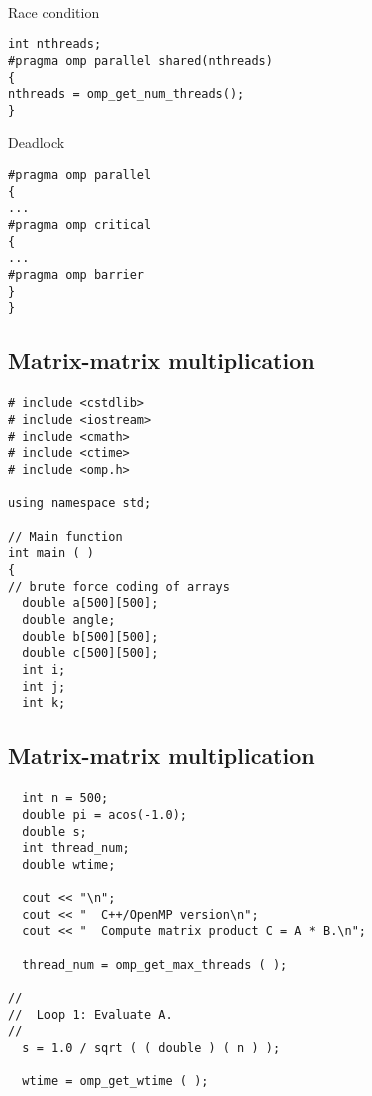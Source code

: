 \documentclass[%
oneside,                 %
final,                   %
10pt]{article}
\begin{document}
\paragraph{}
Race condition
\begin{verbatim}
int nthreads;
#pragma omp parallel shared(nthreads)
{
nthreads = omp_get_num_threads();
}
\end{verbatim}
Deadlock
\begin{verbatim}
#pragma omp parallel
{
...
#pragma omp critical
{
...
#pragma omp barrier
}
}
\end{verbatim}




\subsection*{Matrix-matrix multiplication}

\paragraph{}
\begin{verbatim}
# include <cstdlib>
# include <iostream>
# include <cmath>
# include <ctime>
# include <omp.h>

using namespace std;

// Main function
int main ( )
{
// brute force coding of arrays
  double a[500][500];
  double angle;
  double b[500][500];
  double c[500][500];
  int i;
  int j;
  int k;
\end{verbatim}




\subsection*{Matrix-matrix multiplication}

\paragraph{}
\begin{verbatim}
  int n = 500;
  double pi = acos(-1.0);
  double s;
  int thread_num;
  double wtime;

  cout << "\n";
  cout << "  C++/OpenMP version\n";
  cout << "  Compute matrix product C = A * B.\n";

  thread_num = omp_get_max_threads ( );

//
//  Loop 1: Evaluate A.
//
  s = 1.0 / sqrt ( ( double ) ( n ) );

  wtime = omp_get_wtime ( );
\end{verbatim}
\end{document}
